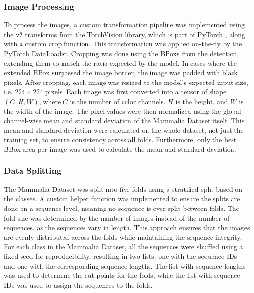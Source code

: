         \subsubsection{Image Processing}
        To process the images, a custom transformation pipeline was implemented using the v2 transforms from the TorchVision library, which is part of PyTorch \autocite{paszkePyTorchImperativeStyle2019}, along with a custom crop function.
        This transformation was applied on-the-fly by the PyTorch DataLoader.
        Cropping was done using the \acp{BBox} from the detection, extending them to match the ratio expected by the model.
        In cases where the extended \ac{BBox} surpassed the image border, the image was padded with black pixels.
        After cropping, each image was resized to the model's expected input size, i.e. \(224\times224\) pixels.
        Each image was first converted into a tensor of shape \((C, H, W)\), where \(C\) is the number of color channels, \(H\) is the height, and \(W\) is the width of the image.
        The pixel values were then normalized using the global channel-wise mean and standard deviation of the Mammalia Dataset itself.
        This mean and standard deviation were calculated on the whole dataset, not just the training set, to ensure consistency across all folds.
        Furthermore, only the best \ac{BBox} area per image was used to calculate the mean and standard deviation.


    \subsubsection{Data Splitting}
    The Mammalia Dataset was split into five folds using a stratified split based on the classes.
    A custom helper function was implemented to ensure the splits are done on a sequence level, meaning no sequence is ever split between folds.
    The fold size was determined by the number of images instead of the number of sequences, as the sequences vary in length.
    This approach ensures that the images are evenly distributed across the folds while maintaining the sequence integrity.
    For each class in the Mammalia Dataset, all the sequences were shuffled using a fixed seed for reproducibility, resulting in two lists: one with the sequence IDs and one with the corresponding sequence lengths.
    The list with sequence lengths was used to determine the cut-points for the folds, while the list with sequence IDs was used to assign the sequences to the folds.


